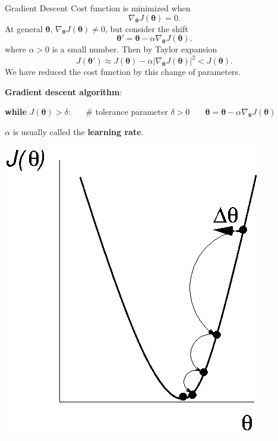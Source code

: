 \documentclass[12pt,t]{beamer}
\begin{document}
\begin{frame}{Gradient Descent}
Cost function is minimized when
$$ \nabla_{\bm{\theta}} J(\bm{\theta})  =0.$$
At general $\bm{\theta}$,  $ \nabla_{\bm{\theta}} J(\bm{\theta})  \neq 0$, but consider the shift
$$ \bm{\theta}' =\bm{\theta} - \alpha   \nabla_{\bm{\theta}} J(\bm{\theta})  .$$
where $\alpha > 0$ is a small number. Then by Taylor expansion
$$ J(\bm{\theta}') \approx J(\bm{\theta})  - \alpha  | \nabla_{\bm{\theta}} J(\bm{\theta})|^2 <  J(\bm{\theta}).$$
We have reduced the cost function by this change of parameters.

\end{frame}

\begin{frame}

{\bf Gradient descent algorithm}: 

\bigskip
{\bf while} $ J(\bm{\theta}) > \delta$: ~~~\# tolerance parameter $\delta >0$
 $~~~~~~~  \bm{\theta} =\bm{\theta} - \alpha   \nabla_{\bm{\theta}} J(\bm{\theta})$

\bigskip
$\alpha$ is usually called the {\bf learning rate}.

\centerline{
\includegraphics[height=0.65\textheight]{gradient_descent.png}
}
\end{frame}
\end{document}
